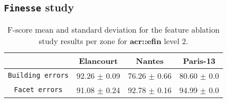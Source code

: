         \FloatBarrier
    \subsection{\texttt{Finesse} study}
        \begin{table}[htbp]
            \centering
            \footnotesize
            \begin{tabular}{c c c c}
                \toprule
                & \textbf{Elancourt} & \textbf{Nantes} & \textbf{Paris-13}\\
                \midrule
                \texttt{Building errors} & 92.26 $\pm$ 0.09 & 76.26 $\pm$ 0.66 & 80.60 $\pm$ 0.0 \\
                \midrule
                \texttt{Facet errors} & 91.08 $\pm$ 0.24 & 92.78 $\pm$ 0.16 & 94.99 $\pm$ 0.0 \\
                \bottomrule
            \end{tabular}
            \caption{
                \label{tab::f_score_ablation_f2}
                F-score mean and standard deviation for the feature ablation study results per zone for \textbf{\gls{acr::efin}} level 2.
            }
        \end{table}

